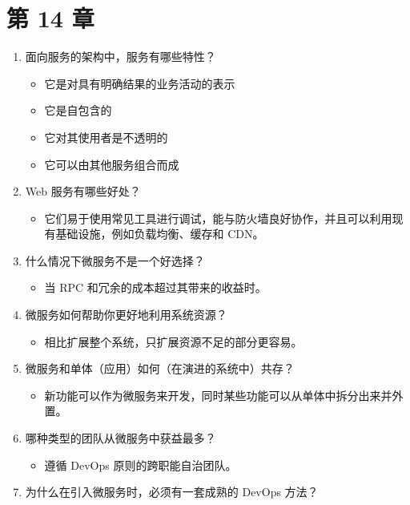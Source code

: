 \section*{第 14 章}

\begin{enumerate}
\item 面向服务的架构中，服务有哪些特性？

\begin{itemize}
\item 它是对具有明确结果的业务活动的表示
\item 它是自包含的
\item 它对其使用者是不透明的
\item 它可以由其他服务组合而成
\end{itemize}
\item Web 服务有哪些好处？

\begin{itemize}
\item 它们易于使用常见工具进行调试，能与防火墙良好协作，并且可以利用现有基础设施，例如负载均衡、缓存和 CDN。
\end{itemize}
\item 什么情况下微服务不是一个好选择？

\begin{itemize}
\item 当 RPC 和冗余的成本超过其带来的收益时。
\end{itemize}
\item 微服务如何帮助你更好地利用系统资源？

\begin{itemize}
\item 相比扩展整个系统，只扩展资源不足的部分更容易。
\end{itemize}
\item 微服务和单体（应用）如何（在演进的系统中）共存？

\begin{itemize}
\item 新功能可以作为微服务来开发，同时某些功能可以从单体中拆分出来并外置。
\end{itemize}
\item 哪种类型的团队从微服务中获益最多？

\begin{itemize}
\item 遵循 DevOps 原则的跨职能自治团队。
\end{itemize}
\item 为什么在引入微服务时，必须有一套成熟的 DevOps 方法？


\end{enumerate}
